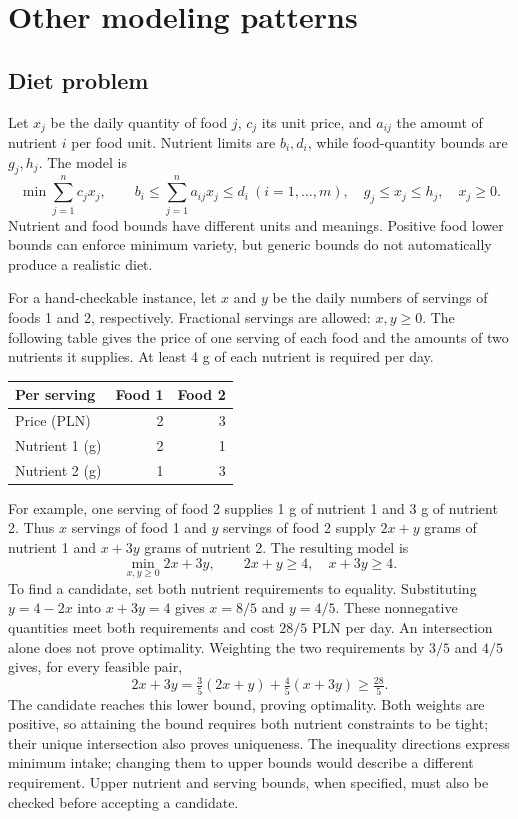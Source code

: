 \documentclass[11pt,a4paper]{article}
\begin{document}
\section{Other modeling patterns}\label{sec:models}
\subsection{Diet problem}
Let $x_j$ be the daily quantity of food $j$, $c_j$ its unit price, and $a_{ij}$
the amount of nutrient $i$ per food unit. Nutrient limits are $b_i,d_i$, while
food-quantity bounds are $g_j,h_j$. The model is
\[
  \min\sum_{j=1}^n c_jx_j,\qquad
  b_i\leq\sum_{j=1}^n a_{ij}x_j\leq d_i\ (i=1,\ldots,m),\quad
  g_j\leq x_j\leq h_j,\quad x_j\geq0.
\]
Nutrient and food bounds have different units and meanings. Positive food lower
bounds can enforce minimum variety, but generic bounds do not automatically
produce a realistic diet.

\begin{samepage}
  For a hand-checkable instance, let $x$ and $y$ be the daily numbers of servings
  of foods 1 and 2, respectively. Fractional servings are allowed: $x,y\geq0$.
  The following table gives the price of one serving of each food and the amounts
  of two nutrients it supplies. At least 4 g of each nutrient is required per day.
  \begin{center}
    \begin{tabular}{lrr}\toprule
      Per serving & Food 1 & Food 2\\\midrule
      Price (PLN) & 2 & 3\\
      Nutrient 1 (g) & 2 & 1\\
      Nutrient 2 (g) & 1 & 3\\\bottomrule
    \end{tabular}
  \end{center}
\end{samepage}
For example, one serving of food 2 supplies 1 g of nutrient 1 and 3 g of
nutrient 2. Thus $x$ servings of food 1 and $y$ servings of food 2 supply
$2x+y$ grams of nutrient 1 and $x+3y$ grams of nutrient 2.
The resulting model is
\[
  \min_{x,y\geq0} 2x+3y,\qquad 2x+y\geq4,\quad x+3y\geq4.
\]
To find a candidate, set both nutrient requirements to equality.
Substituting $y=4-2x$ into $x+3y=4$ gives $x=8/5$ and $y=4/5$.
These nonnegative quantities meet both requirements and cost $28/5$ PLN per day.
An intersection alone does not prove optimality. Weighting the two requirements
by $3/5$ and $4/5$ gives, for every feasible pair,
\[
  2x+3y=\tfrac35(2x+y)+\tfrac45(x+3y)\geq\tfrac{28}{5}.
\]
The candidate reaches this lower bound, proving optimality. Both weights are
positive, so attaining the bound requires both nutrient constraints to be tight;
their unique intersection also proves uniqueness. The inequality
directions express minimum intake; changing them to upper bounds would describe
a different requirement. Upper nutrient and serving bounds, when specified,
must also be checked before accepting a candidate.
\end{document}

